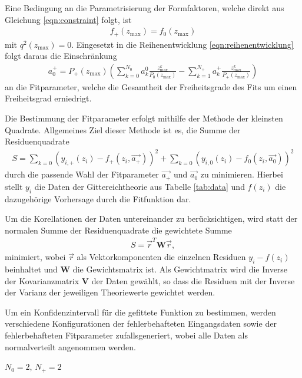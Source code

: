 Eine Bedingung an die Parametrisierung der Formfaktoren, welche direkt aus Gleichung \eqref{eqn:constraint} folgt, ist
\begin{align*}
  f_+(z_\text{max}) = f_0(z_\text{max})
\end{align*}
mit $q^2(z_\text{max}) = 0$.
Eingesetzt in die Reihenentwicklung \eqref{eqn:reihenentwicklung} folgt daraus die Einschränkung
\begin{align*}
  a_0^+ = P_+(z_\text{max}) \left( \sum_{k=0}^{N_0} a_k^0 \frac{z_{\text{max}}^k}{P_0(z_\text{max})} - \sum_{k=1}^{N_+} a_k^+ \frac{z_{\text{max}}^k}{P_+(z_\text{max})} \right)
\end{align*}
an die Fitparameter, welche die Gesamtheit der Freiheitsgrade des Fits um einen Freiheitsgrad erniedrigt.

Die Bestimmung der Fitparameter erfolgt mithilfe der Methode der kleinsten Quadrate.
Allgemeines Ziel dieser Methode ist es, die Summe der Residuenquadrate
\begin{align*}
  S = \sum_{k=0}^{} \left( y_{i,+}(z_i) - f_{+}(z_i, \vec{a_+}) \right)^2 + \sum_{k=0}^{} \left( y_{i,0}(z_i) - f_{0}(z_i, \vec{a_0}) \right)^2
\end{align*}
durch die passende Wahl der Fitparameter $\vec{a_+}$ und $\vec{a_0}$ zu minimieren.
Hierbei stellt $y_i$ die Daten der Gittereichtheorie aus Tabelle \ref{tab:data} und $f(z_i)$ die dazugehörige Vorhersage durch die Fitfunktion dar.

Um die Korellationen der Daten untereinander zu berücksichtigen, wird statt der normalen Summe der Residuenquadrate die gewichtete Summe
\begin{align*}
  S = \vec{r}^T \symbf{W} \vec{r},
\end{align*}
minimiert, wobei $\vec{r}$ als Vektorkomponenten die einzelnen Residuen $y_i - f(z_i)$ beinhaltet und $\symbf{W}$ die Gewichtsmatrix ist.
Als Gewichtmatrix wird die Inverse der Kovarianzmatrix $\symbf{V}$ der Daten gewählt, so dass die Residuen mit der Inverse der Varianz der jeweiligen Theoriewerte gewichtet werden. 

Um ein Konfidenzintervall für die gefittete Funktion zu bestimmen, werden $$ verschiedene Konfigurationen der fehlerbehafteten Eingangsdaten sowie der fehlerbehafteten Fitparameter zufallsgeneriert, wobei alle Daten als normalverteilt angenommen werden. 

\texorpdfstring{$N_0=\num{2}$, $N_+=\num{2}$}{N0 = 2, N+ = 2}


